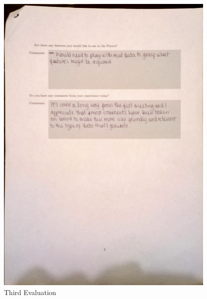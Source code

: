 \begin{figure}[h!]
    \centering
    \includegraphics[width=0.95\textwidth]{images/user_eval/user_eval_17.jpg}
    \caption{Third Evaluation}
\end{figure}

